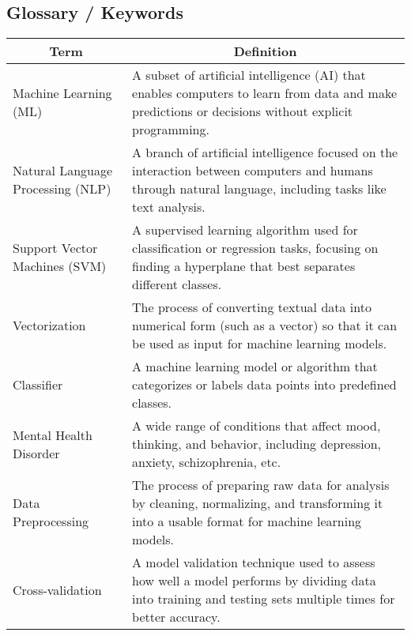 \subsection{Glossary / Keywords}
\noindent

\begin{center}

\begin{tabular}{|p{4cm}|p{10cm}|}
  \hline
  \multicolumn{1}{|c|}{\textbf{Term}} & \multicolumn{1}{c|}{\textbf{Definition}} \\
  
  \hline
  Machine Learning (ML) & A subset of artificial intelligence (AI) that enables computers to learn from data and make predictions or decisions without explicit programming. \\

  \hline 
  Natural Language Processing (NLP) & A branch of artificial intelligence focused on the interaction between computers and humans through natural language, including tasks like text analysis. \\

  \hline 
  Support Vector Machines (SVM) & A supervised learning algorithm used for classification or regression tasks, focusing on finding a hyperplane that best separates different classes. \\

  \hline 
  Vectorization & The process of converting textual data into numerical form (such as a vector) so that it can be used as input for machine learning models. \\

  \hline 
  Classifier & A machine learning model or algorithm that categorizes or labels data points into predefined classes. \\

  \hline
  Mental Health Disorder & A wide range of conditions that affect mood, thinking, and behavior, including depression, anxiety, schizophrenia, etc. \\

  \hline
  Data Preprocessing & The process of preparing raw data for analysis by cleaning, normalizing, and transforming it into a usable format for machine learning models. \\

  \hline 
  Cross-validation & A model validation technique used to assess how well a model performs by dividing data into training and testing sets multiple times for better accuracy. \\


\end{tabular}
\end{center}
